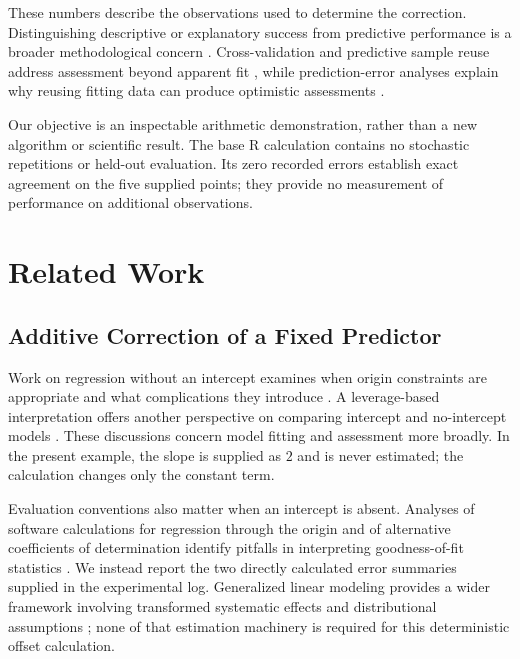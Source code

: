 \documentclass[11pt]{article}
\begin{document}
These numbers describe the observations used to determine the correction. Distinguishing descriptive or explanatory success from predictive performance is a broader methodological concern \cite{Shmueli2010ExplainOr,Yarkoni2017ChoosingPrediction}. Cross-validation and predictive sample reuse address assessment beyond apparent fit \cite{Stone1974CrossvalidatoryChoice,Geisser1975PredictiveSample,Arlot2010SurveyCrossvalidation}, while prediction-error analyses explain why reusing fitting data can produce optimistic assessments \cite{Efron1986HowBiased,Efron2004EstimationPrediction}.

Our objective is an inspectable arithmetic demonstration, rather than a new algorithm or scientific result. The base R calculation contains no stochastic repetitions or held-out evaluation. Its zero recorded errors establish exact agreement on the five supplied points; they provide no measurement of performance on additional observations.

\section{Related Work}

\subsection{Additive Correction of a Fixed Predictor}

Work on regression without an intercept examines when origin constraints are appropriate and what complications they introduce \cite{Hahn1977FittingRegression,Eisenhauer2003RegressionThrough}. A leverage-based interpretation offers another perspective on comparing intercept and no-intercept models \cite{Casella1983LeverageRegression}. These discussions concern model fitting and assessment more broadly. In the present example, the slope is supplied as $2$ and is never estimated; the calculation changes only the constant term.

Evaluation conventions also matter when an intercept is absent. Analyses of software calculations for regression through the origin and of alternative coefficients of determination identify pitfalls in interpreting goodness-of-fit statistics \cite{Gordon1981ErrorsComputer,Kvlseth1985CautionaryNote}. We instead report the two directly calculated error summaries supplied in the experimental log. Generalized linear modeling provides a wider framework involving transformed systematic effects and distributional assumptions \cite{Nelder1972GeneralizedLinear}; none of that estimation machinery is required for this deterministic offset calculation.
\end{document}
